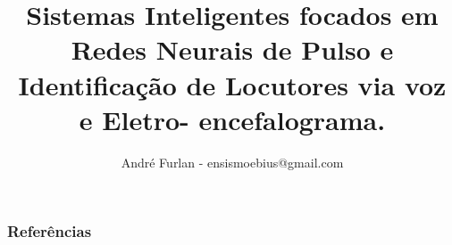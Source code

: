 %
\newif\ifincludebitnet
\includebitnetfalse



\title{Sistemas Inteligentes focados em Redes Neurais de
	Pulso e Identificação de Locutores via voz e Eletro-	encefalograma.}


\author{André Furlan - ensismoebius@gmail.com}

\date{\the\year}



	

	\begin{frame}[allowframebreaks]
		\frametitle{Referências}
		
	\end{frame}



